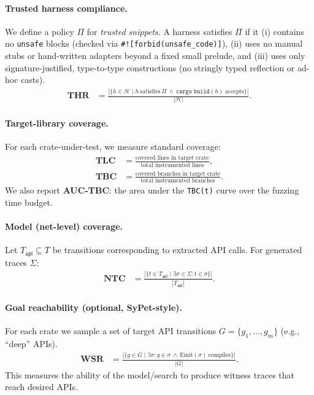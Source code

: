 \documentclass[sigconf]{acmart}
\begin{document}
\paragraph{Trusted harness compliance.}
We define a policy $\Pi$ for \emph{trusted snippets}.
A harness satisfies $\Pi$ if it (i) contains no \texttt{unsafe} blocks (checked via \texttt{\#![forbid(unsafe\_code)]}),
(ii) uses no manual stubs or hand-written adapters beyond a fixed small prelude, and
(iii) uses only signature-justified, type-to-type constructions (no stringly typed reflection or ad-hoc casts).
\begin{align}
\textbf{THR} &= \frac{| \{h\in\mathcal{H}\mid h\ \text{satisfies}\ \Pi \ \wedge\ \texttt{cargo build}(h)\ \text{accepts}\}|}{|\mathcal{H}|}.
\end{align}

\paragraph{Target-library coverage.}
For each crate-under-test, we measure standard coverage:
\begin{align}
\textbf{TLC} &= \frac{\text{covered lines in target crate}}{\text{total instrumented lines}}, \\
\textbf{TBC} &= \frac{\text{covered branches in target crate}}{\text{total instrumented branches}}.
\end{align}
We also report \textbf{AUC-TBC}: the area under the \texttt{TBC(t)} curve over the fuzzing time budget.

\paragraph{Model (net-level) coverage.}
Let $T_{\mathsf{api}}\subseteq T$ be transitions corresponding to extracted API calls.
For generated traces $\Sigma$:
\begin{align}
\textbf{NTC} &= \frac{| \{t\in T_{\mathsf{api}} \mid \exists \sigma\in\Sigma: t\in\sigma\} |}{|T_{\mathsf{api}}|}.
\end{align}

\paragraph{Goal reachability (optional, SyPet-style).}
For each crate we sample a set of target API transitions $G=\{g_1,\dots,g_m\}$ (e.g., ``deep'' APIs).
\begin{align}
\textbf{WSR} &= \frac{|\{g\in G \mid \exists \sigma: g\in\sigma \ \wedge\ \text{Emit}(\sigma)\ \text{compiles}\}|}{|G|}.
\end{align}
This measures the ability of the model/search to produce witness traces that reach desired APIs.
\end{document}

